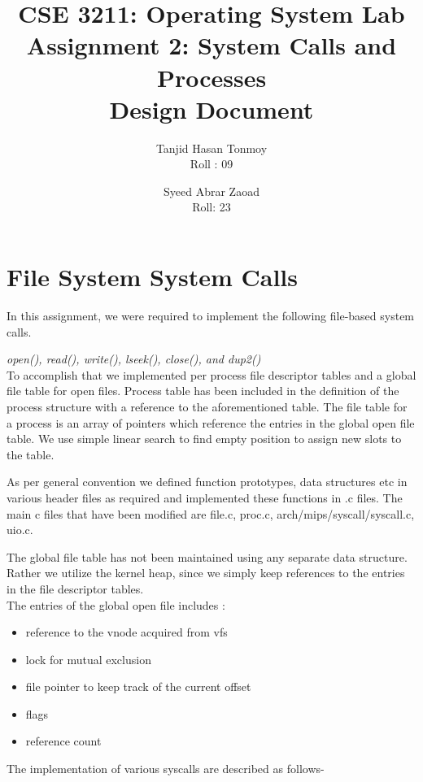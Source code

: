\documentclass[11pt, english]{article}
\title{CSE 3211: Operating System Lab \\ Assignment 2: System Calls and
Processes \\ Design Document } %
\author{Tanjid Hasan Tonmoy\\
	 Roll : 09
	\and
Syeed Abrar Zaoad\\
Roll: 23
}
\date{}
\begin{document}
\maketitle


\section{File System System Calls}

In this assignment, we were required to implement the following file-based system calls.

\emph{open(), read(), write(), lseek(), close(), and dup2()}
\\

To accomplish that we implemented per process file descriptor tables and a global file table for open files. Process table has been included in the definition of the process structure with a reference to the aforementioned table. The file table for a process is an array of pointers which reference the entries in the global open file table. We use simple linear search to find empty position to assign new slots to the table. 

As per general convention we defined function prototypes, data structures etc in various header files as required and implemented these functions in .c files. The main c files that have been modified are file.c, proc.c, arch/mips/syscall/syscall.c, uio.c.

The global file table has not been maintained using any separate data structure. Rather we utilize the kernel heap, since we simply keep references to the entries in the file descriptor tables.
\\

The entries of the global open file includes :
\begin{itemize}
\item reference to the vnode acquired from vfs
\item lock for mutual exclusion
\item file pointer to keep track of the current offset
\item flags
\item reference count
\end{itemize}


The implementation of various syscalls are described as follows-
\end{document}
